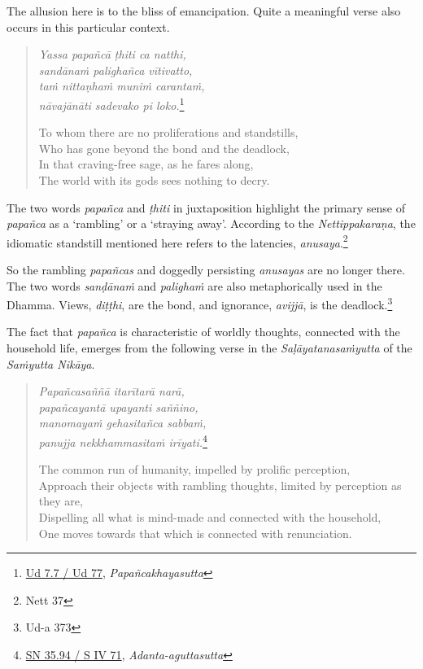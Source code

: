 The allusion here is to the bliss of emancipation. Quite a meaningful verse also occurs in this particular context.

\begin{quote}
\emph{Yassa papañcā ṭhiti ca natthi,}\\
\emph{sandānaṁ palighañca vītivatto,}\\
\emph{taṁ nittaṇhaṁ muniṁ carantaṁ,}\\
\emph{nāvajānāti sadevako pi loko.}\footnote{\href{https://suttacentral.net/ud7.7/pli/ms}{Ud 7.7 / Ud 77}, \emph{Papañcakhayasutta}}

To whom there are no proliferations and standstills,\\
Who has gone beyond the bond and the deadlock,\\
In that craving-free sage, as he fares along,\\
The world with its gods sees nothing to decry.
\end{quote}

The two words \emph{papañca} and \emph{ṭhiti} in juxtaposition highlight the primary sense of \emph{papañca} as a `rambling' or a `straying away'. According to the \emph{Nettippakaraṇa}, the idiomatic standstill mentioned here refers to the latencies, \emph{anusaya}.\footnote{Nett 37}

So the rambling \emph{papañcas} and doggedly persisting \emph{anusayas} are no longer there. The two words \emph{sanḍānaṁ} and \emph{palighaṁ} are also metaphorically used in the Dhamma. Views, \emph{diṭṭhi}, are the bond, and ignorance, \emph{avijjā}, is the deadlock.\footnote{Ud-a 373}

The fact that \emph{papañca} is characteristic of worldly thoughts, connected with the household life, emerges from the following verse in the \emph{Saḷāyatanasaṁyutta} of the \emph{Saṁyutta Nikāya}.

\clearpage

\begin{quote}
\emph{Papañcasaññā itarītarā narā,}\\
\emph{papañcayantā upayanti saññino,}\\
\emph{manomayaṁ gehasitañca sabbaṁ,}\\
\emph{panujja nekkhammasitaṁ irīyati.}\footnote{\href{https://suttacentral.net/sn35.94/pli/ms}{SN 35.94 / S IV 71}, \emph{Adanta-aguttasutta}}

The common run of humanity, impelled by prolific perception,\\
Approach their objects with rambling thoughts, limited by perception as they are,\\
Dispelling all what is mind-made and connected with the household,\\
One moves towards that which is connected with renunciation.
\end{quote}


